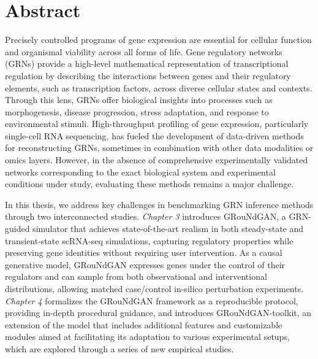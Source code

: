 \chapter*{Abstract}
Precisely controlled programs of gene expression are essential for cellular function and organismal viability across all forms of life. Gene regulatory networks (\textsc{GRN}s) provide a high-level mathematical representation of transcriptional regulation by describing the interactions between genes and their regulatory elements, such as transcription factors, across diverse cellular states and contexts. Through this lens, \textsc{GRN}s offer biological insights into processes such as morphogenesis, disease progression, stress adaptation, and response to environmental stimuli. High-throughput profiling of gene expression, particularly single-cell RNA sequencing, has fueled the development of data-driven methods for reconstructing \textsc{GRN}s, sometimes in combination with other data modalities or omics layers. However, in the absence of comprehensive experimentally validated networks corresponding to the exact biological system and experimental conditions under study, evaluating these methods remains a major challenge. %

In this thesis, we address key challenges in benchmarking \textsc{GRN} inference methods through two interconnected studies. \textit{Chapter 3} introduces GRouNdGAN, a \textsc{GRN}-guided simulator that achieves state-of-the-art realism in both steady-state and transient-state scRNA-seq simulations, capturing regulatory properties while preserving gene identities without requiring user intervention.  As a causal generative model, GRouNdGAN expresses genes under the control of their regulators and can sample from both observational and interventional distributions, allowing matched case/control in-silico perturbation experiments. \textit{Chapter 4} formalizes the GRouNdGAN framework as a reproducible protocol, providing in-depth procedural guidance, and introduces GRouNdGAN-toolkit, an extension of the model that includes additional features and customizable modules aimed at facilitating its adaptation to various experimental setups, which are explored through a series of new empirical studies. 

